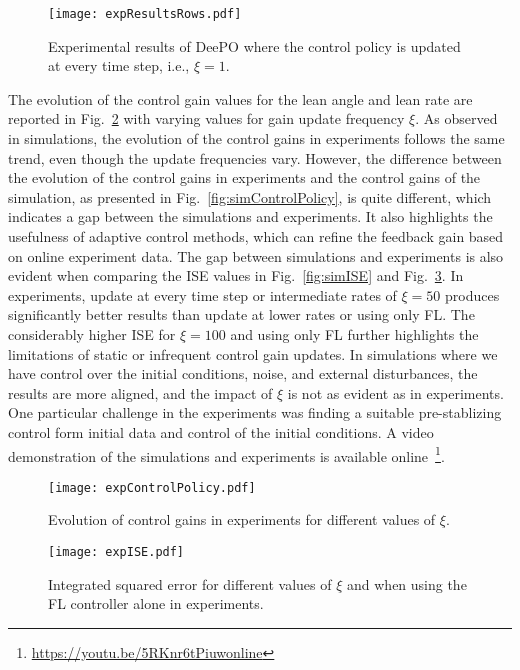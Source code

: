 \begin{figure}[t]
    \centering
    \texttt{[image: expResultsRows.pdf]}
    \caption{Experimental results of DeePO where the control policy is updated at every time step, i.e., $\xi=1$.}
    \label{fig:expResults}
\end{figure}

The evolution of the control gain values for the lean angle and lean rate are reported in Fig.~\ref{fig:expControlPolicy} with varying values for gain update frequency $\xi$.  As observed in simulations, the evolution of the control gains in experiments follows the same trend,  even though the update frequencies vary. However, the difference between the evolution of the control gains in experiments and the control gains of the simulation, as presented in Fig.~\ref{fig:simControlPolicy}, is quite different, which indicates a gap between the simulations and experiments. It also highlights the usefulness of adaptive control methods, which can refine the feedback gain based on online experiment data. The gap between simulations and experiments is also evident when comparing the ISE values in Fig.~\ref{fig:simISE} and Fig.~\ref{fig:expISE}. In experiments, update at every time step or intermediate rates of $\xi=50$ produces significantly better results than update at lower rates or using only FL. The considerably higher ISE for $\xi=100$ and using only FL further highlights the limitations of static or infrequent control gain updates. In simulations where we have control over the initial conditions, noise, and external disturbances, the results are more aligned, and the impact of $\xi$ is not as evident as in experiments. One particular challenge in the experiments was finding a suitable pre-stablizing control form initial data and control of the initial conditions. A video demonstration of the simulations and experiments is available online~\footnote{\href{https://youtu.be/5RKnr6tPiuw}{https://youtu.be/5RKnr6tPiuwonline}}.

\begin{figure}[t]
    \centering
    \texttt{[image: expControlPolicy.pdf]}
    \caption{Evolution of control gains in experiments for different values of $\xi$.}
    \label{fig:expControlPolicy}
\end{figure}

\begin{figure}[t]
    \centering
    \texttt{[image: expISE.pdf]}
    \caption{Integrated squared error for different values of $\xi$ and when using the FL controller alone in experiments.}
    \label{fig:expISE}
\end{figure}



